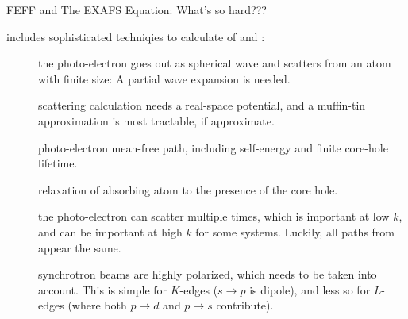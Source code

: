 \begin{slide}{FEFF and The EXAFS Equation: What's so hard???}
  
  \vmm
    
    {\feff} includes sophisticated techniqies to calculate of {}
    and :

    \begin{description}
    \item[] the photo-electron goes out as
      spherical wave and scatters from an atom with finite size: A partial
      wave expansion is needed.

    \item[] scattering calculation needs
      a real-space potential, and a muffin-tin approximation is most
      tractable, if approximate.

    \item[] photo-electron mean-free path,
      including self-energy and finite core-hole lifetime.
      
    \item[] relaxation of absorbing atom to the
      presence of the core hole.
      
    \item[] the photo-electron can scatter
      multiple times, which is important at low $k$, and can be important
      at high $k$ for some systems.  Luckily, all paths from {\feff} appear
      the same.
      
    \item[] synchrotron beams are highly
      polarized, which needs to be taken into account.  This is simple for
      $K$-edges ($s\rightarrow p$ is dipole), and less so for $L$-edges
      (where both $p \rightarrow d$ and $p \rightarrow s$ contribute).

    \end{description}

\vfill
\end{slide} 


